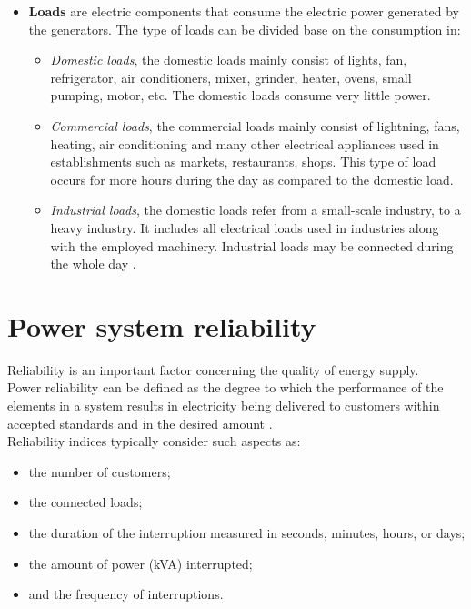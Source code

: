 \begin{itemize}
    \item \textbf{Loads} are electric components that consume the electric power generated by the generators. The type of loads can be divided base on the consumption in:
    \begin{itemize}
        \item[] \emph{Domestic loads}, the domestic loads mainly consist of lights, fan, refrigerator, air conditioners, mixer, grinder, heater, ovens, small pumping, motor, etc. The domestic loads consume very little power.
        \item[] \emph{Commercial loads}, the commercial loads mainly consist of lightning, fans, heating, air conditioning and many other electrical appliances used in establishments such as markets, restaurants, shops. This type of load occurs for more hours during the day as compared to the domestic load.
        \item[] \emph{Industrial loads}, the domestic loads refer from a small-scale industry, to a heavy industry. It includes all electrical loads used in industries along with the employed machinery. Industrial loads may be connected during the whole day \cite{EDNdesign}.
    \end{itemize}
\end{itemize}

\section{Power system reliability}
Reliability is an important factor concerning the quality of energy supply. \\
Power reliability can be defined as the degree to which the performance of the elements in a system results in electricity being delivered to customers within accepted standards and in the desired amount \cite{MPRPQ}. \\
Reliability indices typically consider such aspects as:
\begin{itemize}
 \item the number of customers;
 \item the connected loads;
 \item the duration of the interruption measured in seconds, minutes, hours, or days;
 \item the amount of power (k\gls{VA}) interrupted;  
 \item and the frequency of interruptions.
\end{itemize}

